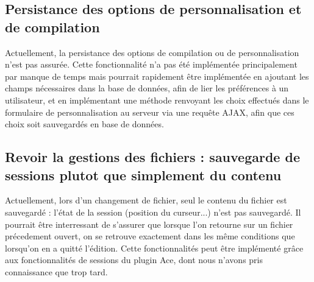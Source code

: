 \subsection{Persistance des options de personnalisation et de compilation}

Actuellement, la persistance des options de compilation ou de personnalisation n'est pas assurée. Cette fonctionnalité n'a pas été implémentée principalement par manque de temps mais pourrait rapidement être implémentée en ajoutant les champs nécessaires dans la base de données, afin de lier les préférences à un utilisateur, et en implémentant une méthode renvoyant les choix effectués dans le formulaire de personnalisation au serveur via une requête AJAX, afin que ces choix soit sauvegardés en base de données.

\subsection{Revoir la gestions des fichiers : sauvegarde de sessions plutot que simplement du contenu}
Actuellement, lors d'un changement de fichier, seul le contenu du fichier est sauvegardé : l'état de la session (position du curseur...) n'est pas sauvegardé. Il pourrait être interressant de s'assurer que lorsque l'on retourne sur un fichier précedement ouvert, on se retrouve exactement dans les même conditions que lorsqu'on en a quitté l'édition. Cette fonctionnalités peut être implémenté grâce aux fonctionnalités de sessions du plugin Ace, dont nous n'avons pris connaissance que trop tard.
